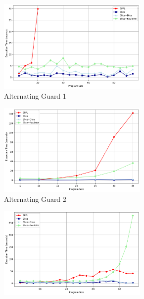 \begin{figure}[!t]
\centering
\begin{subfigure}{0.3\textwidth}
\includegraphics[width=0.8\textwidth]{../images/scaling/build_alternating_guard_slice_1.png}
\caption{Alternating Guard 1}
\label{fig:alt-benchmarks-a}
\end{subfigure}
\hfill
\begin{subfigure}{0.3\textwidth}
\includegraphics[width=0.8\textwidth]{../images/scaling/build_alternating_guard_slice_2.png}
\caption{Alternating Guard 2}
\label{fig:alt-benchmarks-b}
\end{subfigure}
\hfill
\vspace{0.5em}
\begin{subfigure}{0.3\textwidth}
\includegraphics[width=0.8\textwidth]{../images/scaling/build_alternating_guard_slice_3.png}

\end{subfigure}
\end{figure}
